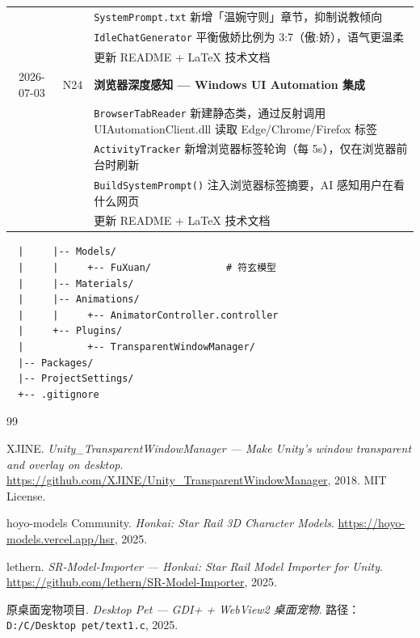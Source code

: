 \documentclass[12pt,a4paper]{ctexart}
\begin{document}
\begin{table}[H]
\begin{tabular}{cl>{\raggedright\arraybackslash}p{}}
           &       & \texttt{SystemPrompt.txt} 新增「温婉守则」章节，抑制说教倾向\\
           &       & \texttt{IdleChatGenerator} 平衡傲娇比例为 3:7（傲:娇），语气更温柔\\
           &       & 更新 README + LaTeX 技术文档\\
2026-07-03 & N24  & \textbf{浏览器深度感知 — Windows UI Automation 集成}\\
           &       & \texttt{BrowserTabReader} 新建静态类，通过反射调用 UIAutomationClient.dll 读取 Edge/Chrome/Firefox 标签\\
           &       & \texttt{ActivityTracker} 新增浏览器标签轮询（每 5s），仅在浏览器前台时刷新\\
           &       & \texttt{BuildSystemPrompt()} 注入浏览器标签摘要，AI 感知用户在看什么网页\\
           &       & 更新 README + LaTeX 技术文档\\
\bottomrule
\end{tabular}
\end{table}

\begin{verbatim}
  |     |-- Models/
  |     |     +-- FuXuan/             # 符玄模型
  |     |-- Materials/
  |     |-- Animations/
  |     |     +-- AnimatorController.controller
  |     +-- Plugins/
  |           +-- TransparentWindowManager/
  |-- Packages/
  |-- ProjectSettings/
  +-- .gitignore
\end{verbatim}

\begin{thebibliography}{99}

XJINE. \textit{Unity\_TransparentWindowManager --- Make Unity's window transparent and overlay on desktop}.
\url{https://github.com/XJINE/Unity_TransparentWindowManager}, 2018. MIT License.

hoyo-models Community. \textit{Honkai: Star Rail 3D Character Models}.
\url{https://hoyo-models.vercel.app/hsr}, 2025.

lethern. \textit{SR-Model-Importer --- Honkai: Star Rail Model Importer for Unity}.
\url{https://github.com/lethern/SR-Model-Importer}, 2025.

原桌面宠物项目. \textit{Desktop Pet --- GDI+ + WebView2 桌面宠物}.
路径：\texttt{D:/C/Desktop pet/text1.c}, 2025.

\end{thebibliography}
\end{document}
